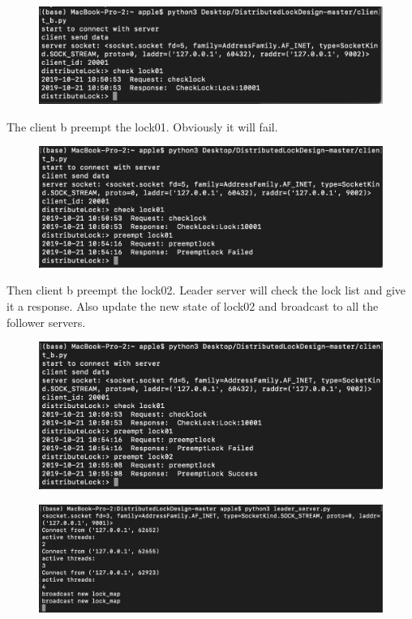 \documentclass[10pt]{article}
\begin{document}
\begin{figure}[H]
\centerline{\includegraphics[width = 1\textwidth]{screenshot//client_04.png}}
\end{figure}

The client b preempt the lock01. Obviously it will fail.

\begin{figure}[H]
\centerline{\includegraphics[width = 1\textwidth]{screenshot//client_05.png}}
\end{figure}

Then client b preempt the lock02. Leader server will check the lock list and give it a response. Also update the new state of lock02 and broadcast to all the follower servers.

\begin{figure}[H]
\centerline{\includegraphics[width = 1\textwidth]{screenshot//client_06.png}}
\end{figure}

\begin{figure}[H]
\centerline{\includegraphics[width = 1\textwidth]{screenshot//leader_04.png}}
\end{figure}
\end{document}
